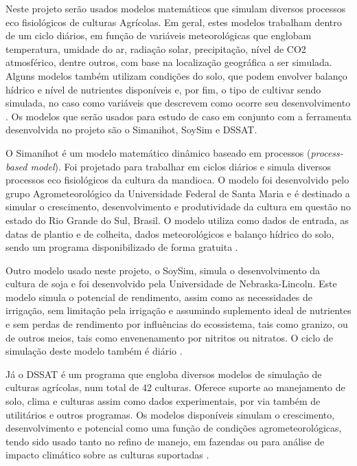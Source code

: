 \documentclass[tg]{mdtufsm}
\begin{document}
        	Neste projeto serão usados modelos matemáticos que simulam diversos processos eco fisiológicos de culturas Agrícolas. Em geral, estes modelos trabalham dentro de um ciclo diários, em função de variáveis meteorológicas que englobam temperatura, umidade do ar, radiação solar, precipitação, nível de CO2 atmosférico, dentre outros, com base na localização geográfica a ser simulada. Alguns modelos também utilizam condições do solo, que podem envolver balanço hídrico e nível de nutrientes disponíveis e, por fim, o tipo de cultivar sendo simulada, no caso como variáveis que descrevem como ocorre seu desenvolvimento \cite{SimanihotArt}. Os modelos que serão usados para estudo de caso em conjunto com a ferramenta desenvolvida no projeto são o Simanihot, SoySim e DSSAT.

        	O Simanihot é um modelo matemático dinâmico baseado em processos (\emph{process-based model}). Foi projetado para trabalhar em ciclos diários e simula diversos processos eco fisiológicos da cultura da mandioca. O modelo foi desenvolvido pelo grupo Agrometeorológico da Universidade Federal de Santa Maria e é destinado a simular o crescimento, desenvolvimento e produtividade da cultura em questão no estado do Rio Grande do Sul, Brasil. O modelo utiliza como dados de entrada, as datas de plantio e de colheita, dados meteorológicos e balanço hídrico do solo, sendo um programa disponibilizado de forma gratuita \cite{Simanihot}.

        	Outro modelo usado neste projeto, o SoySim, simula o desenvolvimento da cultura de soja e foi desenvolvido pela Universidade de Nebraska-Lincoln. Este modelo simula o potencial de rendimento, assim como as necessidades de irrigação, sem limitação pela irrigação e assumindo suplemento ideal de nutrientes e sem perdas de rendimento por influências do ecossistema, tais como granizo, ou de outros meios, tais como envenenamento por nitritos ou nitratos. O ciclo de simulação deste modelo também é diário \cite{SoySim}.

        	Já o DSSAT é um programa que engloba diversos modelos de simulação de culturas agrícolas, num total de 42 culturas. Oferece suporte ao manejamento de solo, clima e culturas assim como dados experimentais, por via também de utilitários e outros programas. Os modelos disponíveis simulam o crescimento, desenvolvimento e potencial como uma função de condições agrometeorológicas, tendo sido usado tanto no refino de manejo, em fazendas ou para análise de impacto climático sobre as culturas suportadas \cite{dssat}.
\end{document}
